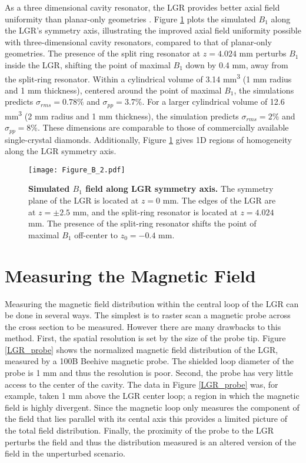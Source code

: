 As a three dimensional cavity resonator, the LGR provides better axial field uniformity than planar-only geometries \cite{floch2016towards,kapitanova2017dielectric,angerer2016collective}. Figure \ref{LGR_axial_simulated} plots the simulated $B_1$ along the LGR's symmetry axis, illustrating the improved axial field uniformity possible with three-dimensional cavity
resonators, compared to that of planar-only geometries. The presence of the split ring resonator at $z = 4.024$ mm perturbs $B_1$ inside the LGR, shifting the point of maximal $B_1$ down by 0.4 mm, away from the split-ring resonator. Within a cylindrical volume of 3.14 mm\textsuperscript{3} (1 mm radius and 1 mm thickness), centered around the point of maximal $B_1$, the simulations predicts $\sigma_{rms} = 0.78\%$ and $\sigma_{pp} = 3.7\%$. For a larger cylindrical volume of 12.6 mm\textsuperscript{3} (2 mm radius and 1 mm thickness), the simulation predicts $\sigma_{rms} = 2\%$ and $\sigma_{pp} = 8\%$. These dimensions are comparable to those of commercially available single-crystal diamonds. Additionally, Figure \ref{LGR_axial_simulated} gives 1D regions of homogeneity along the LGR symmetry axis.

\begin{figure}[t!]
\centering
\texttt{[image: Figure\_B\_2.pdf]}  
\caption{\textbf{Simulated $B_1$ field along LGR symmetry axis.} The symmetry plane of the LGR is located at $z = 0$ mm. The edges of the LGR are at $z = \pm 2.5$ mm, and the split-ring resonator is located at $z = 4.024$ mm. The presence of the split-ring resonator shifts the point of maximal $B_1$ off-center to $z_0 = -0.4$ mm.}
\label{LGR_axial_simulated}
\end{figure}

\section{Measuring the Magnetic Field} \label{field}

Measuring the magnetic field distribution within the central loop of the LGR can be done in several ways. The simplest is to raster scan a magnetic probe across the cross section to be measured. However there are many drawbacks to this method. First, the spatial resolution is set by the size of the probe tip. Figure \ref{LGR_probe} shows the normalized magnetic field distribution of the LGR, measured by a 100B Beehive magnetic probe. The shielded loop diameter of the probe is 1 mm and thus the resolution is poor. Second, the probe has very little access to the center of the cavity. The data in Figure \ref{LGR_probe} was, for example, taken 1 mm above the LGR center loop; a region in which the magnetic field is highly divergent. Since the magnetic loop only measures the component of the field that lies parallel with its cental axis this provides a limited picture of the total field distribution. Finally, the proximity of the probe to the LGR perturbs the field and thus the distribution measured is an altered version of the field in the unperturbed scenario. 


